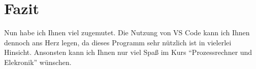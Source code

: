 \section{Fazit}
\label{sec:fazit}
Nun habe ich Ihnen viel zugemutet. Die Nutzung von VS Code kann ich Ihnen dennoch ans Herz legen, da dieses Programm sehr nützlich ist in vielerlei Hinsicht. Ansonsten kann ich Ihnen nur viel Spaß im Kurs \enquote{Prozessrechner und Elekronik} wünschen.